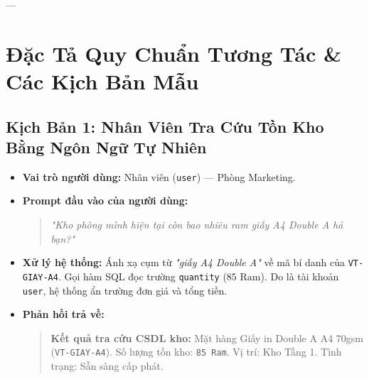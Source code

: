 \documentclass[11pt,a4paper]{article}
\begin{document}
---

\section{Đặc Tả Quy Chuẩn Tương Tác \& Các Kịch Bản Mẫu}

\subsection{Kịch Bản 1: Nhân Viên Tra Cứu Tồn Kho Bằng Ngôn Ngữ Tự Nhiên}
\begin{itemize}[leftmargin=1.5em]
    \item \textbf{Vai trò người dùng:} Nhân viên (\texttt{user}) — Phòng Marketing.
    \item \textbf{Prompt đầu vào của người dùng:}
    \begin{quote}
    \textit{"Kho phòng mình hiện tại còn bao nhiêu ram giấy A4 Double A hả bạn?"}
    \end{quote}
    \item \textbf{Xử lý hệ thống:} Ánh xạ cụm từ \textit{"giấy A4 Double A"} về mã bí danh của \texttt{VT-GIAY-A4}. Gọi hàm SQL đọc trường \texttt{quantity} ($85\text{ Ram}$). Do là tài khoản \texttt{user}, hệ thống ẩn trường đơn giá và tổng tiền.
    \item \textbf{Phản hồi trả về:}
    \begin{quote}
    \textbf{Kết quả tra cứu CSDL kho:} Mặt hàng Giấy in Double A A4 70gsm (\texttt{VT-GIAY-A4}). Số lượng tồn kho: \texttt{85 Ram}. Vị trí: Kho Tầng 1. Tình trạng: Sẵn sàng cấp phát.
    \end{quote}
\end{itemize}
\end{document}
